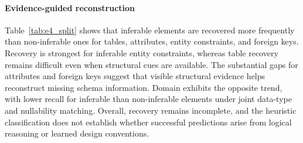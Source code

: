 \paragraph{Evidence-guided reconstruction}
Table~\ref{tab:e4_split} shows that inferable elements are recovered more frequently than non-inferable ones for tables, attributes, entity constraints, and foreign keys. Recovery is strongest for inferable entity constraints, whereas table recovery remains difficult even when structural cues are available. The substantial gaps for attributes and foreign keys suggest that visible structural evidence helps reconstruct missing schema information. Domain exhibits the opposite trend, with lower recall for inferable than non-inferable elements under joint data-type and nullability matching. Overall, recovery remains incomplete, and the heuristic classification does not establish whether successful predictions arise from logical reasoning or learned design conventions.
